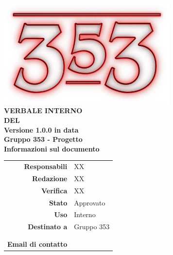 \documentclass[openany, a4paper, 12pt]{report}
\begin{document}
\begin{titlepage}
	\centering
	\vfill
	{
		\bfseries
		\vskip2cm
		\includegraphics[width=9cm]{../../common/images/logo.png} \\
		\vfill
		\Huge{VERBALE INTERNO\\DEL {}}\\
		\vfill
		\Large Versione 1.0.0 in data \\ %
		\large Gruppo 353 - Progetto \progetto \\
		\vfill
		\normalsize Informazioni sul documento\\
		\begin{table}[htbp]
			\centering
			\renewcommand\arraystretch{1.2}
			\begin{tabular}{r|l}
				\hline
				\textbf{Responsabili}	& XX \\
				
				\textbf{Redazione} 		& XX \\
				\textbf{Verifica} 		& XX \\	
				
				\textbf{Stato} 			& Approvato\\
				\textbf{Uso}			& Interno\\
				\textbf{Destinato a}   	& Gruppo 353\\
										& \Vardanega\\
										& \Cardin\\
				
				\textbf{Email di contatto}	& \mailgroup
			\end{tabular}
		\end{table}
		\vfill 
	}    
\end{titlepage}


 
\end{document}
